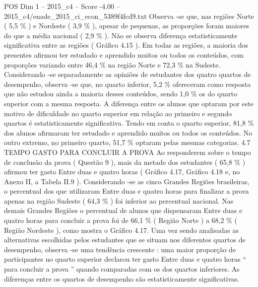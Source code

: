 \begin{textsample}{POS Dim 1 – 2015\_c4 – Score -4.00 – 2015\_c4/enade\_2015\_ci\_econ\_5389f4fcd9.txt}
Observa -se que, nas regiões Norte ( 5,5 \% ) e Nordeste ( 3,9 \% ), apesar de pequenas, as proporções foram maiores do que a média nacional ( 2,9 \% ).
Não se observa diferença estatisticamente significativa entre as regiões ( Gráfico 4.15 ).
Em todas as regiões, a maioria dos presentes afirmou ter estudado e aprendido muitos ou todos os conteúdos, com proporções variando entre 46,4 \% na região Norte e 72,3 \% na Sudeste.
Considerando -se separadamente as opiniões de estudantes dos quatro quartos de desempenho, observa -se que, no quarto inferior, 5,2 \% ofereceram como resposta que não estudou ainda a maioria desses conteúdos, sendo 1,0 \% os do quarto superior com a mesma resposta.
A diferença entre os alunos que optaram por este motivo de dificuldade no quarto superior em relação ao primeiro e segundo quartos é estatisticamente significativa.
Tendo em conta o quarto superior, 81,8 \% dos alunos afirmaram ter estudado e aprendido muitos ou todos os conteúdos.
No outro extremo, no primeiro quarto, 51,7 \% optaram pelas mesmas categorias. 4.7 TEMPO GASTO PARA CONCLUIR A PROVA Ao responderem sobre o tempo de conclusão da prova ( Questão 9 ), mais da metade dos estudantes ( 65,8 \% ) afirmou ter gasto Entre duas e quatro horas ( Gráfico 4.17, Gráfico 4.18 e, no Anexo II, a Tabela II.9 ).
Considerando -se as cinco Grandes Regiões brasileiras, o percentual dos que utilizaram Entre duas e quatro horas para finalizar a prova apenas na região Sudeste ( 64,3 \% ) foi inferior ao percentual nacional.
Nas demais Grandes Regiões o percentual de alunos que dispensaram Entre duas e quatro horas para concluir a prova foi de 66,1 \% ( Região Norte ) a 68,2 \% ( Região Nordeste ), como mostra o Gráfico 4.17.
Uma vez sendo analisadas as alternativas escolhidas pelos estudantes que se situam nos diferentes quartos de desempenho, observa -se uma tendência crescente : uma maior proporção de participantes no quarto superior declarou ter gasto Entre duas e quatro horas “ para concluir a prova ” quando comparadas com os dos quartos inferiores.
As diferenças entre os quartos de desempenho são estatisticamente significativas.

\end{textsample}
